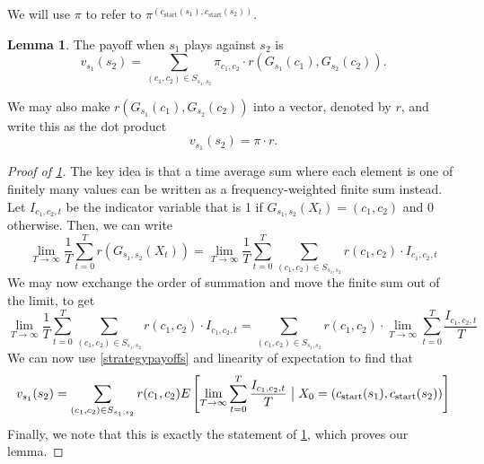 \documentclass[12pt]{article}
\theoremstyle{definition}
\newtheorem{lemma}[theorem]{Lemma}
\theoremstyle{remark}
\begin{document}
We will use $\pi$ to refer to $\pi^{(c_{\text{start}}(s_1), c_\text{start}(s_2))}$.

\begin{lemma}
  \label{payofftimeaverage}
  The payoff when $s_1$ plays against $s_2$ is
  \begin{equation*}
    v_{s_1}(s_2) = \sum_{(c_1,c_2) \in S_{s_1,s_2}} \pi_{c_1,c_2} \cdot r(G_{s_1}(c_1),G_{s_2}(c_2)).
  \end{equation*}
\end{lemma}

We may also make $r(G_{s_1}(c_1),G_{s_2}(c_2))$ into a vector, denoted by $r$, and write this as the dot product \begin{equation*}
  v_{s_1}(s_2) = \pi \cdot r.
\end{equation*}


\begin{proof}[Proof of \cref{payofftimeaverage}]
  The key idea is that a time average sum where each element is one of finitely many values can be written as a frequency-weighted finite sum instead. Let $I_{c_1,c_2,t}$ be the indicator variable that is 1 if $G_{s_1,s_2}(X_t) = (c_1,c_2)$ and 0 otherwise.  Then, we can write \begin{equation*}
    \lim_{T \to \infty} \frac{1}{T} \sum_{t = 0}^T r(G_{s_1,s_2}(X_t)) = 
    \lim_{T \to \infty}\frac{1}{T} \sum_{t = 0}^T \sum_{(c_1,c_2) \in S_{s_1,s_2}} r(c_1,c_2) \cdot I_{c_1,c_2,t}
  \end{equation*}
  We may now exchange the order of summation and move the finite sum out of the limit, to get \begin{equation*}
    \lim_{T \to \infty}\frac{1}{T} \sum_{t = 0}^T \sum_{(c_1,c_2) \in S_{s_1,s_2}} r(c_1,c_2) \cdot I_{c_1,c_2,t}
    = \sum_{(c_1,c_2) \in S_{s_1,s_2}} r(c_1,c_2) \cdot \lim_{T \to \infty} \sum_{t=0}^T \frac{I_{c_1,c_2,t} }{T}
  \end{equation*}
  We can now use \cref{strategypayoffs} and linearity of expectation to find that
  \begin{equation*}
    v_{s_1}(s_2) = \sum_{(c_1,c_2) \in S_{s_1,s_2}} r(c_1, c_2) E \left[ \lim_{T \to \infty} \sum_{t=0}^T \frac{I_{c_1,c_2,t}}{T} \bigm| X_0 = (c_{\text{start}}(s_1), c_{\text{start}}(s_2))
    \right]
  \end{equation*}
  Finally, we note that this is exactly the statement of \cref{payofftimeaverage}, which proves our lemma.
\end{proof}
\end{document}
